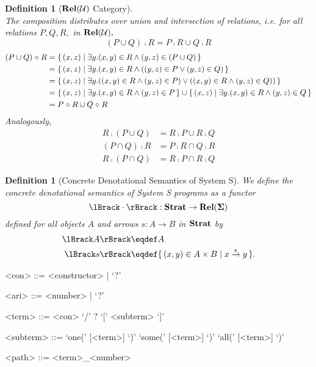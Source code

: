 \documentclass{article}
\newtheorem{definition}[theorem]{Definition}
\begin{document}
\begin{definition}[$\mathbf{Rel}(\mathcal{U})$ Category]
\[  \]
  The composition distributes over union and intersection of relations, i.e. for all relations $P,Q,R,$ in $\mathbf{Rel}(\mathcal{U}),$ \[(P \cup Q) \comp R = P \comp R \cup Q \comp R\]
  \begin{align*}
    (P \cup Q) \mathrel{\circ} R &= \{\,  (x,z)  \mid  \exists y. (x,y) \in R \land (y,z) \in (P \cup Q)  \,\} \\
                       &= \{\,  (x,z)  \mid  \exists y. (x,y) \in R \land ((y,z) \in P \lor (y,z) \in Q)  \,\} \\
                       &= \{\,  (x,z)  \mid  \exists y. ((x,y) \in R \land (y,z) \in P) \lor ((x,y) \in R \land (y,z) \in Q))  \,\} \\
                       &= \{\,  (x,z)  \mid  \exists y. (x,y) \in R \land (y,z) \in P  \,\} \cup  \{\,  (x,z)  \mid  \exists y. (x,y) \in R \land (y,z) \in Q  \,\} \\
                       &= P \mathrel{\circ} R \cup Q \mathrel{\circ} R
  \end{align*}
  Analogously,
  \begin{align*}
    R \comp (P \cup Q) &= R \comp P \cup R \comp Q \\
    (P \cap Q) \comp R &= P \comp R \cap Q \comp R \\
    R \comp (P \cap Q) &= R \comp P \cap R \comp Q
  \end{align*}
\end{definition}

\begin{definition}[Concrete Denotational Semantics of System S] \normalfont
  We define the concrete denotational semantics of System S programs as a functor \[\sem{\cdot} : \Strat \rightarrow \Rel(\State) \] defined for all objects $A$ and arrows $s:A \rightarrow B$ in $\mathbf{Strat}$ by
  \begin{align*}
    \sem{A} &\eqdef A \\
    \sem{s} &\eqdef \setbuild{(x,y) \in A \times B}{\transformxy{x}{s}{y}}.
  \end{align*}
\end{definition}

\begin{grammar}
  <con> ::= <constructor> | `?'

  <ari> ::= <number> | `?'

  <term> ::= <con> `/' ? `[' <subterm> `]'

  <subterm> ::= `one(' [<term>] `)' \alt `some(' [<term>] `)' \alt `all(' [<term>] `)' \alt [<path>]

  <path> ::= <term>_<number>
\end{grammar}
\end{document}
